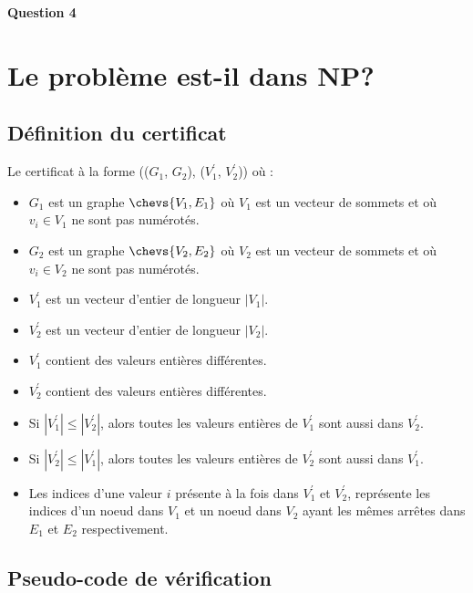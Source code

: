 \documentclass[class=article]{standalone}
\begin{document}
\centerline{\Huge \bf Question 4}
\bigskip

\section*{Le problème est-il dans NP?}
\subsection*{Définition du certificat}

Le certificat à la forme (($G_1$, $G_2$), ($V^\prime_1$, $V^\prime_2$)) où :
\begin{itemize}
  \item $G_1$ est un graphe $\chevs{V_1, E_1}$ où $V_1$ est un vecteur de sommets et où $v_i \in V_1$ ne sont pas numérotés.
  \item $G_2$ est un graphe $\chevs{V_2, E_2}$ où $V_2$ est un vecteur de sommets et où $v_i \in V_2$ ne sont pas numérotés.
  \item $V^\prime_1$ est un vecteur d'entier de longueur $|V_1|$.
  \item $V^\prime_2$ est un vecteur d'entier de longueur $|V_2|$.
  \item $V^\prime_1$ contient des valeurs entières différentes.
  \item $V^\prime_2$ contient des valeurs entières différentes.
  \item Si $|V^\prime_1| \leq |V^\prime_2|$, alors toutes les valeurs entières 
        de $V^\prime_1$ sont aussi dans $V^\prime_2$.
  \item Si $|V^\prime_2| \leq |V^\prime_1|$, alors toutes les valeurs entières 
        de $V^\prime_2$ sont aussi dans $V^\prime_1$.
  \item Les indices d'une valeur $i$ présente à la fois dans $V^\prime_1$ et $V^\prime_2$, 
        représente les indices d'un noeud dans $V_1$ et un noeud dans $V_2$
        ayant les mêmes arrêtes dans $E_1$ et $E_2$ respectivement.
\end{itemize}

\subsection*{Pseudo-code de vérification}
\end{document}
